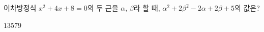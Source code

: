 이차방정식 $x^2+4x+8=0$의 두 근을 $\alpha$, $\beta$라 할 때, $\alpha^2+2\beta^2-2\alpha+2\beta+5$의 값은?
\begin{choices32}{$1$}{$3$}{$5$}{$7$}{$9$}\end{choices32}
